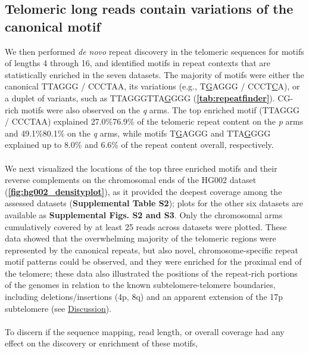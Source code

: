 \documentclass{article}
\begin{document}
\subsection*{Telomeric long reads contain variations of the canonical motif}
    We then performed \textit{de novo} repeat discovery in the telomeric sequences for motifs of lengths 4 through 16,
            and identified motifs in repeat contexts that are statistically enriched in the seven datasets.
        The majority of motifs were either the canonical TTAGGG / CCCTAA,
            its variations (e.g., T\underline{G}AGGG / CCCT\underline{C}A),
            or a duplet of variants, such as TTAGGGTTA\underline{G}GGG
            (\textbf{\autoref{tab:repeatfinder}}).
        CG-rich motifs were also observed on the \textit{q} arms.
        The top enriched motif (TTAGGG / CCCTAA) explained
            27.0\%\textendash{}76.9\% of the telomeric repeat content on the \textit{p} arms
            and 49.1\%\textendash{}80.1\% on the \textit{q} arms,
            while motifs T\underline{G}AGGG and TTA\underline{G}GGG explained up to 8.0\% and 6.6\% of the repeat content overall, respectively.
    \\~\\
    We next visualized the locations of the top three enriched motifs and their reverse complements
        on the chromosomal ends of the HG002 dataset (\textbf{\autoref{fig:hg002_densityplot}}),
        as it provided the deepest coverage among the assessed datasets (\textbf{Supplemental Table S2});
            plots for the other six datasets are available as \textbf{Supplemental Figs. S2 and S3}.
        Only the chromosomal arms cumulatively covered by at least 25 reads across datasets were plotted.
    These data showed that the overwhelming majority of the telomeric regions were represented by the canonical repeats,
        but also novel, chromosome-specific repeat motif patterns could be observed,
            and they were enriched for the proximal end of the telomere;
            these data also illustrated the positions of the repeat-rich portions of the genomes in relation to the
            known subtelomere-telomere boundaries, including deletions/insertions (4p, 8q)
            and an apparent extension of the 17p subtelomere (see \hyperref[sec:discussion]{Discussion}).
    \\~\\ %
    To discern if the sequence mapping, read length, or overall coverage had any effect on the discovery or enrichment of these motifs,
\end{document}
